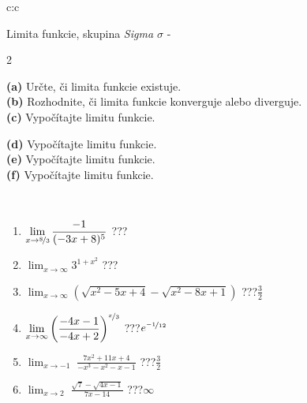 \documentclass[10pt]{report}
\begin{document}
\newpage
\thispagestyle{empty}
\begin{tabular}{c:c}
\begin{minipage}[c][104.5mm][t]{0.5\linewidth}
\begin{center}
\vspace{7mm}
{\huge Limita funkcie, skupina \textit{Sigma $\sigma$} -}\\[5mm]
\begin{minipage}{0.95\linewidth}
\begin{center}
{\small \begin{multicols}{2} \raggedright
\textbf{(a)} Určte, či limita funkcie existuje. \\[1mm]
\textbf{(b)} Rozhodnite, či limita funkcie konverguje alebo diverguje. \\[1mm]
\textbf{(c)} Vypočítajte limitu funkcie. \par \columnbreak
\textbf{(d)} Vypočítajte limitu funkcie. \\[1mm]
\textbf{(e)} Vypočítajte limitu funkcie. \\[1mm]
\textbf{(f)} Vypočítajte limitu funkcie. \\[1mm]
\end{multicols}
}
\end{center}
\end{minipage}
\\[4mm]
\begin{minipage}{0.79\linewidth}
\begin{center}
\begin{varwidth}{\linewidth}
\begin{enumerate}
\normalsize
\item $\displaystyle\lim_{x\to\nicefrac{8}{3}}{\frac{-1}{(-3x+8)^{5}}}$\quad \dotfill\; ???\;\dotfill \quad {}
\item $\displaystyle\lim_{x\to\infty}{3^{1+x^2}}$\quad \dotfill\; ???\;\dotfill \quad {}
\item $\displaystyle\lim_{x\to\infty}{\left(\sqrt{x^2-5x+4} - \sqrt{x^2-8x+1}\right)}$\quad \dotfill\; ???\;\dotfill \quad $\frac{3}{2}$
\item $\displaystyle\lim_{x\to\infty}{\left( \frac{-4x-1}{-4x+2} \right)^{\nicefrac{x}{3}}}$\quad \dotfill\; ???\;\dotfill \quad $e^{\nicefrac{-1}{12}}$
\item $\displaystyle\lim_{x\to -1}{\;\frac{7x^2+11x+4}{-x^3-x^2-x-1}}$\quad \dotfill\; ???\;\dotfill \quad $\frac{3}{2}$
\item $\displaystyle\lim_{x\to 2}{\;\frac{\sqrt{7}-\sqrt{4x-1}}{7x-14}}$\quad \dotfill\; ???\;\dotfill \quad $\infty$

\end{enumerate}
\end{varwidth}
\end{center}
\end{minipage}
\end{center}
\end{minipage}
\end{tabular}
\end{document}
